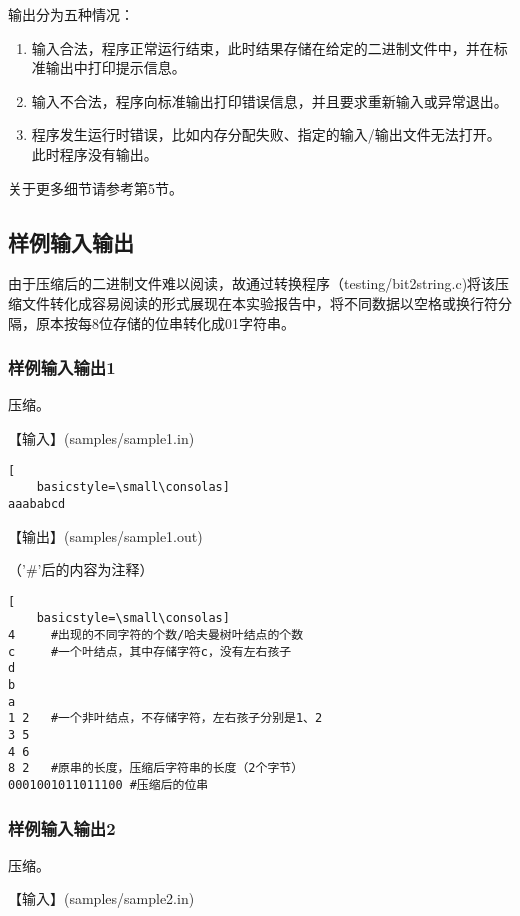 \documentclass{article}
\begin{document}
输出分为五种情况：

\begin{enumerate}
    \item 输入合法，程序正常运行结束，此时结果存储在给定的二进制文件中，并在标准输出中打印提示信息。
    \item 输入不合法，程序向标准输出打印错误信息，并且要求重新输入或异常退出。
    \item 程序发生运行时错误，比如内存分配失败、指定的输入/输出文件无法打开。此时程序没有输出。
\end{enumerate}

关于更多细节请参考第5节。

\subsection{样例输入输出}

由于压缩后的二进制文件难以阅读，故通过转换程序（testing/bit2string.c)将该压缩文件转化成容易阅读的形式展现在本实验报告中，将不同数据以空格或换行符分隔，原本按每8位存储的位串转化成01字符串。

\subsubsection{样例输入输出1}

压缩。

【输入】(samples/sample1.in)

\begin{lstlisting}[
    basicstyle=\small\consolas]
aaababcd
\end{lstlisting}

【输出】(samples/sample1.out)

（'\#'后的内容为注释）

\begin{lstlisting}[
    basicstyle=\small\consolas]
4     #出现的不同字符的个数/哈夫曼树叶结点的个数
c     #一个叶结点，其中存储字符c，没有左右孩子 
d
b
a
1 2   #一个非叶结点，不存储字符，左右孩子分别是1、2
3 5
4 6
8 2   #原串的长度，压缩后字符串的长度（2个字节）
0001001011011100 #压缩后的位串
\end{lstlisting}

\subsubsection{样例输入输出2}

压缩。

【输入】(samples/sample2.in)
\end{document}

